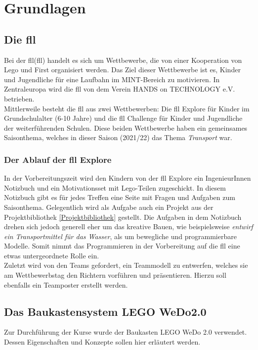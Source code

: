 \chapter{Grundlagen}

\section{Die \acrlong{fll}}
Bei der \acrlong{fll}(\acrshort{fll}) handelt es sich um Wettbewerbe, die von einer Kooperation von \gls{Lego} und \gls{First} organisiert werden. Das Ziel dieser Wettbewerbe ist es, Kinder und Jugendliche für eine Laufbahn im \gls{MINT}-Bereich zu motivieren. In Zentraleuropa wird die \acrshort{fll} von dem Verein HANDS on TECHNOLOGY e.V. betrieben.\\
Mittlerweile besteht die \acrshort{fll} aus zwei Wettbewerben: Die \acrlong{fll} Explore für Kinder im Grundschulalter (6-10 Jahre) und die \acrlong{fll} Challenge für Kinder und Jugendliche der weiterführenden Schulen. Diese beiden Wettbewerbe haben ein gemeinsames Saisonthema, welches in dieser Saison (2021/22) das Thema \textit{Transport} war.\\

\subsection{Der Ablauf der \acrshort{fll} Explore} \label{preparation}
In der Vorbereitungszeit wird den Kindern von der \acrshort{fll} Explore ein IngenieurInnen Notizbuch und ein Motivationsset mit \gls{Lego}-Teilen zugeschickt. In diesem Notizbuch gibt es für jedes Treffen eine Seite mit Fragen und Aufgaben zum Saisonthema. Gelegentlich wird als Aufgabe auch ein Projekt aus der Projektbibliothek \ref{Projektbibliothek} gestellt. Die Aufgaben in dem Notizbuch drehen sich jedoch generell eher um das kreative Bauen, wie beispielsweise \textit{entwirf ein Transportmittel für das Wasser}, als um bewegliche und programmierbare Modelle. Somit nimmt das Programmieren in der Vorbereitung auf die \acrshort{fll} eine etwas untergeordnete Rolle ein.\\
Zuletzt wird von den Teams gefordert, ein Teammodell zu entwerfen, welches sie am Wettbewerbstag den Richtern vorführen und präsentieren. Hierzu soll ebenfalls ein Teamposter erstellt werden.


\section{Das Baukastensystem LEGO WeDo2.0} \label{Wedo}
Zur Durchführung der Kurse wurde der Baukasten LEGO WeDo 2.0 verwendet. Dessen Eigenschaften und Konzepte sollen hier erläutert werden.
